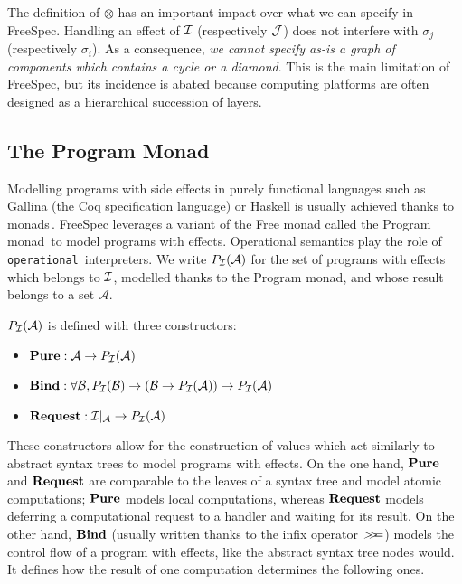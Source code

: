 The definition of $\otimes$ has an important impact over what we can specify in
FreeSpec.
%
%
Handling an effect of $\mathcal{I}$ (respectively $\mathcal{J}$) does not interfere with
$\sigma_j$ (respectively $\sigma_i$).
%
As a consequence, \emph{we cannot specify as-is a graph of components which
contains a cycle or a diamond}.
%
This is the main limitation of FreeSpec, but its incidence is abated because
computing platforms are often designed as a hierarchical succession of layers.

\subsection{The Program Monad}

Modelling programs with side effects in purely functional languages such as {\sc
Gallina} (the Coq specification language) or Haskell is usually achieved thanks
to monads\,\cite{hoareetal2001monad}.
%
FreeSpec leverages a variant of the Free monad called the Program
monad\,\cite{operational} to model programs with effects. Operational semantics
play the role of \texttt{operational}\,\cite{operational} interpreters.
%
We write $P_{\mathcal{I}}(\mathcal{A})$ for the set of programs with effects which
belongs to $\mathcal{I}$, modelled thanks to the Program monad, and whose result belongs
to a set $\mathcal{A}$.

\begin{definition}
  $P_{\mathcal{I}}(\mathcal{A})$ is defined with three constructors:
  \begin{itemize}
  \item $\mathbf{\mathbf{Pure}} : \mathcal{A} \rightarrow P_{\mathcal{I}}(\mathcal{A})$
  \item
    $\mathbf{\mathbf{Bind}} : \forall \mathcal{B}, P_{\mathcal{I}}(\mathcal{B}) \rightarrow
    (\mathcal{B} \rightarrow P_{\mathcal{I}}(\mathcal{A})) \rightarrow
    P_{\mathcal{I}}(\mathcal{A})$
  \item
    $\mathbf{\mathbf{Request}} : \mathcal{I}|_{\mathcal{A}} \rightarrow
    P_{\mathcal{I}}(\mathcal{A})$
  \end{itemize}
\end{definition}
%
These constructors allow for the construction of values which
act similarly to abstract syntax trees to model programs with effects.
%
On the one hand, $\mathbf{\mathbf{Pure}}$ and $\mathbf{\mathbf{Request}}$ are comparable to the
leaves of a syntax tree and model atomic computations; $\mathbf{\mathbf{Pure}}$ models
local computations, whereas $\mathbf{\mathbf{Request}}$ models deferring a computational
request to a handler and waiting for its result.
%
On the other hand, $\mathbf{\mathbf{Bind}}$ (usually written thanks to the infix operator
$>\!\!>\!\!=$) models the control flow of a program with effects, like the abstract
syntax tree nodes would.
%
It defines how the result of one computation determines the following ones.

